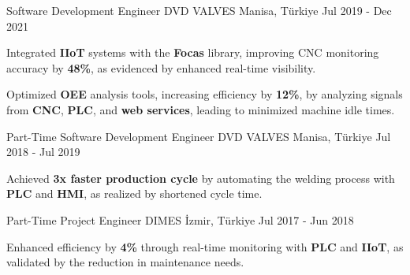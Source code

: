\begin{cventries}
  \cventry
    {Software Development Engineer} %
    {DVD VALVES } %
    {Manisa, Türkiye} %
    {Jul 2019 - Dec 2021} %
    {
      \begin{cvitems} %
        \item {Integrated \textbf{IIoT} systems with the \textbf{Focas} library, improving CNC monitoring accuracy by \textbf{48\%}, as evidenced by enhanced real-time visibility.}
        \item {Optimized \textbf{OEE} analysis tools, increasing efficiency by \textbf{12\%}, by analyzing signals from \textbf{CNC}, \textbf{PLC}, and \textbf{web services}, leading to minimized machine idle times.}
      \end{cvitems}
    }

  \cventry
    {Part-Time Software Development Engineer} %
    {DVD VALVES} %
    {Manisa, Türkiye} %
    {Jul 2018 - Jul 2019} %
    {
      \begin{cvitems} %
        \item {Achieved \textbf{3x faster production cycle} by automating the welding process with \textbf{PLC} and \textbf{HMI}, as realized by shortened cycle time.}
      \end{cvitems}
    }


  \cventry
    {Part-Time Project Engineer} %
    {DIMES} %
    {İzmir, Türkiye} %
    {Jul 2017 - Jun 2018 } %
    {
      \begin{cvitems} %
        \item {Enhanced efficiency by \textbf{4\%} through real-time monitoring with \textbf{PLC} and \textbf{IIoT}, as validated by the reduction in maintenance needs.}
      \end{cvitems}
    }
    \vspace{1mm}

\end{cventries}
